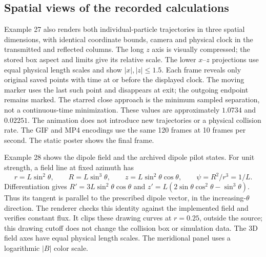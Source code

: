\documentclass[11pt,letterpaper]{article}
\begin{document}
\subsection*{Spatial views of the recorded calculations}
Example 27 also renders both individual-particle trajectories in three
spatial dimensions, with identical coordinate bounds, camera and physical
clock in the transmitted and reflected columns. The long $z$ axis is
visually compressed; the stored box aspect and limits give its relative
scale. The lower $x$--$z$ projections use equal physical length scales and
show $|x|,|z|\le1.5$. Each frame reveals only original saved points with
time at or before the displayed clock. The moving marker uses the last
such point and disappears at exit; the outgoing endpoint remains marked.
The starred close approach is the minimum sampled separation, not a
continuous-time minimization. These values are approximately $1.0734$ and
$0.02251$. The animation does not introduce new trajectories or a physical
collision rate. The GIF and MP4 encodings use the same 120 frames at
10 frames per second. The static poster shows the final frame.

Example 28 shows the dipole field and the archived dipole pilot states.
For unit strength, a field line at fixed azimuth has
\[
 r=L\sin^2\theta,\qquad R=L\sin^3\theta,\qquad
 z=L\sin^2\theta\cos\theta,\qquad \psi=R^2/r^3=1/L.
\]
Differentiation gives
$R'=3L\sin^2\theta\cos\theta$ and
$z'=L(2\sin\theta\cos^2\theta-\sin^3\theta)$.
Thus its tangent is parallel to the prescribed dipole vector, in the
increasing-$\theta$ direction. The renderer checks this identity against
the implemented field and verifies constant flux. It clips these drawing
curves at $r=0.25$, outside the source; this drawing cutoff does not change
the collision box or simulation data. The 3D field axes have equal physical
length scales. The meridional panel uses a logarithmic $|B|$ color scale.
\end{document}
